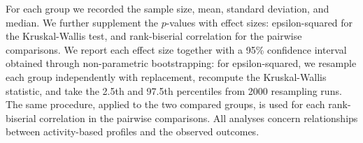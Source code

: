 For each group we recorded the sample size, mean, standard deviation, and median. We further supplement the $p$-values with effect sizes: epsilon-squared for the Kruskal-Wallis test, and rank-biserial correlation for the pairwise comparisons. We report each effect size together with a 95\% confidence interval obtained through non-parametric bootstrapping: for epsilon-squared, we resample each group independently with replacement, recompute the Kruskal-Wallis statistic, and take the 2.5th and 97.5th percentiles from 2000 resampling runs. The same procedure, applied to the two compared groups, is used for each rank-biserial correlation in the pairwise comparisons. All analyses concern relationships between activity-based profiles and the observed outcomes.
